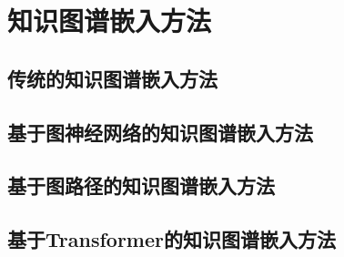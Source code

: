\section{知识图谱嵌入方法}

\subsection{传统的知识图谱嵌入方法}

\subsection{基于图神经网络的知识图谱嵌入方法}

\subsection{基于图路径的知识图谱嵌入方法}

\subsection{基于Transformer的知识图谱嵌入方法}